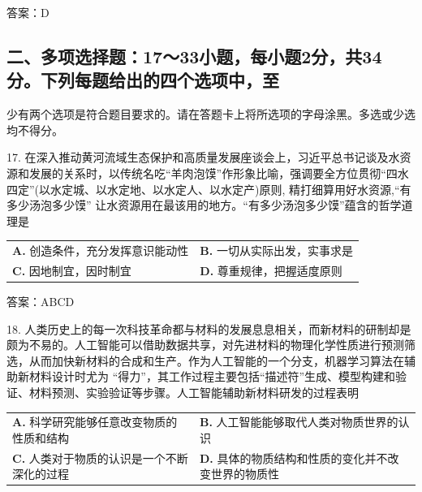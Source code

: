 \documentclass[UTF8,11pt]{ctexart}
\begin{document}
答案：D


\subsection*{二、多项选择题：17～33小题，每小题2分，共34分。下列每题给出的四个选项中，至}

少有两个选项是符合题目要求的。请在答题卡上将所选项的字母涂黑。多选或少选均不得分。


17. 在深入推动黄河流域生态保护和高质量发展座谈会上，习近平总书记谈及水资源和发展的关系时，以传统名吃“羊肉泡馍”作形象比喻，强调要全方位贯彻“四水四定”(以水定城、以水定地、以水定人、以水定产)原则, 精打细算用好水资源,“有多少汤泡多少馍” 让水资源用在最该用的地方。“有多少汤泡多少馍”蕴含的哲学道理是


\begin{center}\begin{tabular}{>{\raggedright\arraybackslash}p{\dimexpr(\linewidth-4\tabcolsep)/2\relax}>{\raggedright\arraybackslash}p{\dimexpr(\linewidth-4\tabcolsep)/2\relax}}
\textbf{A.} 创造条件，充分发挥意识能动性 & \textbf{B.} 一切从实际出发，实事求是\\[.35em]
\textbf{C.} 因地制宜，因时制宜 & \textbf{D.} 尊重规律，把握适度原则\\[.35em]\end{tabular}\end{center}

答案：ABCD


18. 人类历史上的每一次科技革命都与材料的发展息息相关，而新材料的研制却是颇为不易的。人工智能可以借助数据共享，对先进材料的物理化学性质进行预测筛选，从而加快新材料的合成和生产。作为人工智能的一个分支，机器学习算法在辅助新材料设计时尤为 “得力”，其工作过程主要包括“描述符”生成、模型构建和验证、材料预测、实验验证等步骤。人工智能辅助新材料研发的过程表明


\begin{center}\begin{tabular}{>{\raggedright\arraybackslash}p{\dimexpr(\linewidth-4\tabcolsep)/2\relax}>{\raggedright\arraybackslash}p{\dimexpr(\linewidth-4\tabcolsep)/2\relax}}
\textbf{A.} 科学研究能够任意改变物质的性质和结构 & \textbf{B.} 人工智能能够取代人类对物质世界的认识\\[.35em]
\textbf{C.} 人类对于物质的认识是一个不断深化的过程 & \textbf{D.} 具体的物质结构和性质的变化并不改变世界的物质性\\[.35em]\end{tabular}\end{center}
\end{document}
